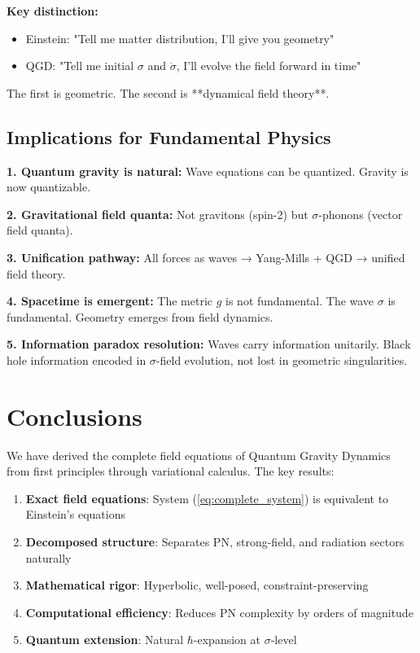 \documentclass[11pt,a4paper]{article}
\theoremstyle{definition}
\theoremstyle{remark}
\begin{document}
		\textbf{Key distinction:}
		\begin{itemize}
			\item Einstein: "Tell me matter distribution, I'll give you geometry"
			\item QGD: "Tell me initial $\sigma$ and $\dot{\sigma}$, I'll evolve the field forward in time"
		\end{itemize}
		
		The first is geometric. The second is **dynamical field theory**.
		
		\subsection{Implications for Fundamental Physics}
		
		\textbf{1. Quantum gravity is natural:}
		Wave equations can be quantized. Gravity is now quantizable.
		
		\textbf{2. Gravitational field quanta:}
		Not gravitons (spin-2) but $\sigma$-phonons (vector field quanta).
		
		\textbf{3. Unification pathway:}
		All forces as waves → Yang-Mills + QGD → unified field theory.
		
		\textbf{4. Spacetime is emergent:}
		The metric $g$ is not fundamental. The wave $\sigma$ is fundamental. Geometry emerges from field dynamics.
		
		\textbf{5. Information paradox resolution:}
		Waves carry information unitarily. Black hole information encoded in $\sigma$-field evolution, not lost in geometric singularities.
		
		\section{Conclusions}
		
		We have derived the complete field equations of Quantum Gravity Dynamics from first principles through variational calculus. The key results:
		
		\begin{enumerate}
			\item \textbf{Exact field equations}: System (\ref{eq:complete_system}) is equivalent to Einstein's equations
			
			\item \textbf{Decomposed structure}: Separates PN, strong-field, and radiation sectors naturally
			
			\item \textbf{Mathematical rigor}: Hyperbolic, well-posed, constraint-preserving
			
			\item \textbf{Computational efficiency}: Reduces PN complexity by orders of magnitude
			
			\item \textbf{Quantum extension}: Natural $\hbar$-expansion at $\sigma$-level
		\end{enumerate}
		
\end{document}
